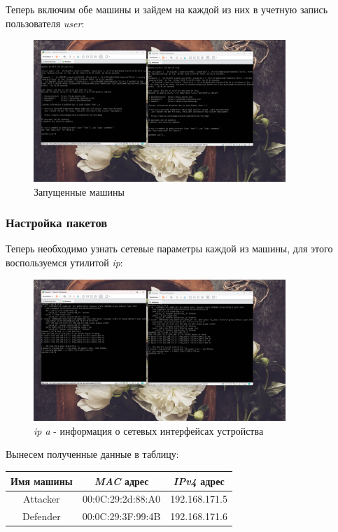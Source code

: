 \documentclass[a4paper]{article}
\begin{document}
  Теперь включим обе машины и зайдем на каждой из них в учетную запись пользователя \textit{user}:

  \begin{figure}[H]
    \centering
    \includegraphics[width=0.85\textwidth]{03_00 (22)}
    \caption{Запущенные машины}
    \label{img:22}
  \end{figure}

  \subsubsection{Настройка пакетов}

  Теперь необходимо узнать сетевые параметры каждой из машины,
  для этого воспользуемся утилитой \textit{ip}:

  \begin{figure}[H]
    \centering
    \includegraphics[width=0.85\textwidth]{03_00 (29)}
    \caption{\textit{ip a} - информация о сетевых интерфейсах устройства}
    \label{img:29}
  \end{figure}

  Вынесем полученные данные в таблицу:
  \begin{table}[H]
    \centering
    \begin{tabular}{| c | c | c |}
      \hline
      Имя машины & \textit{MAC} адрес & \textit{IPv4} адрес \\
      \hline
      Attacker & 00:0C:29:2d:88:A0 & 192.168.171.5 \\
      \hline
      Defender & 00:0C:29:3F:99:4B & 192.168.171.6 \\
      \hline
    \end{tabular}
  \end{table}
\end{document}

